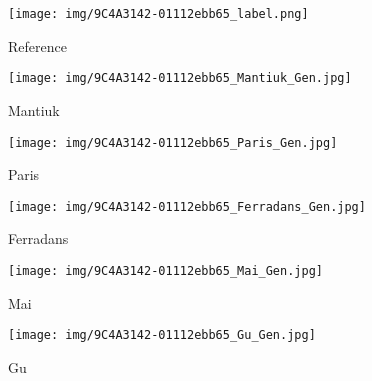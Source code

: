 \documentclass[journal]{IEEEtran}
\begin{document}
\begin{figure*}[t]
        \centering
        \begin{subfigure}[b]{0.245\textwidth}
            \centering
            \texttt{[image: img/9C4A3142-01112ebb65\_label.png]}
            \caption[]%
            {{\small Reference }}    
            \label{fig:mean and std of net14}
        \end{subfigure}
        \begin{subfigure}[b]{0.245\textwidth}  
            \centering 
            \texttt{[image: img/9C4A3142-01112ebb65\_Mantiuk\_Gen.jpg]}
            \caption[]%
            {{\small Mantiuk \cite{mantiuk2008display} }}    
            \label{fig:mean and std of net24}
        \end{subfigure}
        \begin{subfigure}[b]{0.245\textwidth}   
            \centering 
            \texttt{[image: img/9C4A3142-01112ebb65\_Paris\_Gen.jpg]}
            \caption[]%
            {{\small Paris \cite{paris2015local} }}    
            \label{fig:mean and std of net34}
        \end{subfigure}
        \begin{subfigure}[b]{0.245\textwidth}   
            \centering 
            \texttt{[image: img/9C4A3142-01112ebb65\_Ferradans\_Gen.jpg]}
            \caption[]%
            {{\small Ferradans \cite{ferradans2011analysis}     }}    
            \label{fig:mean and std of net44}
        \end{subfigure}
        \label{fig:mean and std of nets}
        \centering
        \begin{subfigure}[b]{0.245\textwidth}
            \centering
            \texttt{[image: img/9C4A3142-01112ebb65\_Mai\_Gen.jpg]}
            \caption[]%
            {{\small Mai \cite{mai2011optimizing} }}    
            \label{fig:mean and std of net14}
        \end{subfigure}
        \begin{subfigure}[b]{0.245\textwidth}  
            \centering 
            \texttt{[image: img/9C4A3142-01112ebb65\_Gu\_Gen.jpg]}
            \caption[]%
            {{\small Gu \cite{gu2013local} }}    
            \label{fig:mean and std of net24}
        \end{subfigure}

\end{figure*}
\end{document}
